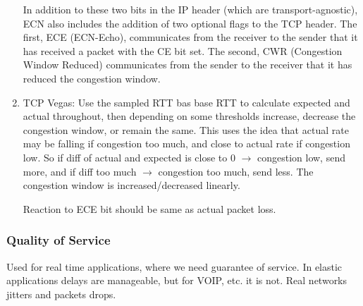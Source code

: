 \documentclass[11pt, a4paper]{article}
\begin{document}
\begin{enumerate}
    In addition to these two bits in the IP header (which are transport-agnostic), ECN also includes the addition of two optional flags to the TCP header. The first, ECE (ECN-Echo), communicates from the receiver to the sender that it has received a packet with the CE bit set. The second, CWR (Congestion Window Reduced) communicates from the sender to the receiver that it has reduced the congestion window.
    \item TCP Vegas: Use the sampled RTT bas base RTT to calculate expected and actual throughout, then depending on some thresholds increase, decrease the congestion window, or remain the same. This uses the idea that actual rate may be falling if congestion too much, and close to actual rate if congestion low. So if diff of actual and expected is close to 0 $\to$ congestion low, send more, and if diff too much $\to$ congestion too much, send less. The congestion window is increased/decreased linearly.
    
    Reaction to ECE bit should be same as actual packet loss.
\end{enumerate}

\subsubsection{Quality of Service}
Used for real time applications, where we need guarantee of service. In elastic applications delays are manageable, but for VOIP, etc. it is not. Real networks jitters and packets drops.
\end{document}
